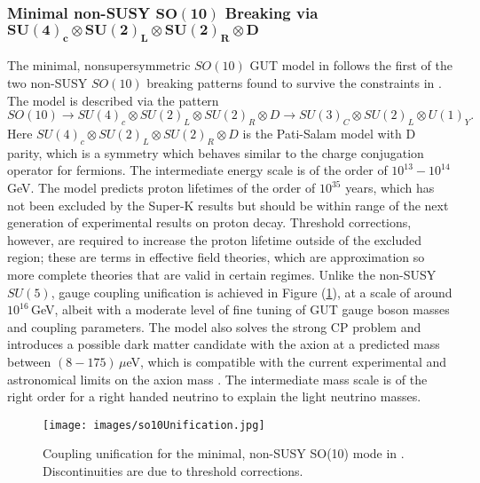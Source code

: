 \documentclass{article}
\begin{document}
\subsubsection{Minimal non-SUSY $\bm{SO(10)}$ Breaking via $\bm{SU(4)_c \otimes SU(2)_L \otimes SU(2)_R \otimes D}$}
\label{sec:GUT_SO10_1}

The minimal, nonsupersymmetric $SO(10)$ GUT model in \cite{SO10_1} follows the first of the two non-SUSY $SO(10)$ breaking patterns found to survive the constraints in \cite{SO10_UnificationDM}. The model is described via the pattern
\begin{equation}
SO(10)\rightarrow SU(4)_c \otimes SU(2)_L \otimes SU(2)_R \otimes D \rightarrow SU(3)_C\otimes SU(2)_L \otimes U(1)_Y.
\end{equation}
Here $SU(4)_c \otimes SU(2)_L \otimes SU(2)_R\otimes D$ is the Pati-Salam model with D parity\cite{DParity}, which is a symmetry which behaves similar to the charge conjugation operator for fermions. The intermediate energy scale is of the order of $10^{13}-10^{14}\,$GeV.
The model predicts proton lifetimes of the order of $10^{35}$ years, which has not been excluded by the Super-K results but should be within range of the next generation of experimental results on proton decay. Threshold corrections, however, are required to increase the proton lifetime outside of the excluded region; these are terms in effective field theories, which are approximation so more complete theories that are valid in certain regimes. 
Unlike the non-SUSY $SU(5)$, gauge coupling unification is achieved in Figure (\ref{fig:so10Coupling}), at a scale of around $10^{16}\,$GeV, albeit with a moderate level of fine tuning of GUT gauge boson masses and coupling parameters. The model also solves the strong CP problem and introduces a possible dark matter candidate with the axion at a predicted mass between $(8-175)\,\mu$eV, which is compatible with the current experimental and astronomical limits on the axion mass \cite{AxionMass}. The intermediate mass scale is of the right order for a right handed neutrino to explain the light neutrino masses.

\begin{figure}
    \centering
    \texttt{[image: images/so10Unification.jpg]}
    \caption{Coupling unification for the minimal, non-SUSY SO(10) mode in \cite{SO10_1}. Discontinuities are due to threshold corrections.\label{fig:so10Coupling}}
\end{figure}
\end{document}
